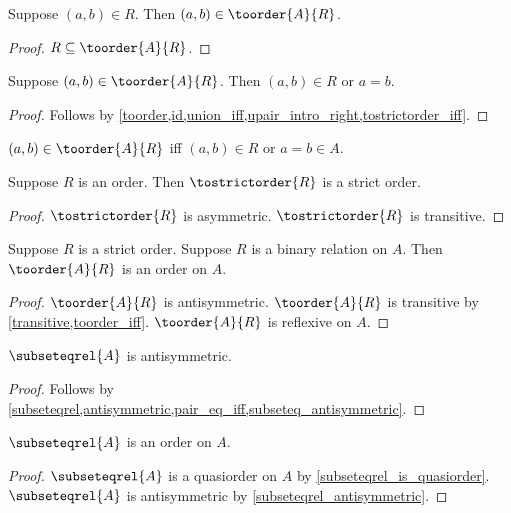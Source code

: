 \begin{proposition}\label{toorder_intro}
    Suppose $(a,b)\in R$.
    Then $(a,b)\in\toorder{A}{R}$.
\end{proposition}
\begin{proof}
    $R\subseteq\toorder{A}{R}$.
\end{proof}

\begin{proposition}\label{toorder_elim}
    Suppose $(a,b)\in\toorder{A}{R}$.
    Then $(a,b)\in R$ or $a = b$.
\end{proposition}
\begin{proof}
    Follows by \cref{toorder,id,union_iff,upair_intro_right,tostrictorder_iff}.
\end{proof}

\begin{proposition}\label{toorder_iff}
    $(a,b)\in\toorder{A}{R}$ iff $(a,b)\in R$ or $a = b\in A$.
\end{proposition}

\begin{proposition}\label{strictorder_from_order}
    Suppose $R$ is an order.
    Then $\tostrictorder{R}$ is a strict order.
\end{proposition}
\begin{proof}
    $\tostrictorder{R}$ is asymmetric.
    $\tostrictorder{R}$ is transitive.
\end{proof}

\begin{proposition}\label{order_from_strictorder}
    Suppose $R$ is a strict order.
    Suppose $R$ is a binary relation on $A$.
    Then $\toorder{A}{R}$ is an order on $A$.
\end{proposition}
\begin{proof}
    $\toorder{A}{R}$ is antisymmetric.
    $\toorder{A}{R}$ is transitive by \cref{transitive,toorder_iff}.
    $\toorder{A}{R}$ is reflexive on $A$.
\end{proof}

\begin{proposition}\label{subseteqrel_antisymmetric}
    $\subseteqrel{A}$ is antisymmetric.
\end{proposition}
\begin{proof}
    Follows by \cref{subseteqrel,antisymmetric,pair_eq_iff,subseteq_antisymmetric}.
\end{proof}


\begin{proposition}\label{subseteqrel_is_order}
    $\subseteqrel{A}$ is an order on $A$.
\end{proposition}
\begin{proof}
    $\subseteqrel{A}$ is a quasiorder on $A$ by \cref{subseteqrel_is_quasiorder}.
    $\subseteqrel{A}$ is antisymmetric by \cref{subseteqrel_antisymmetric}.
\end{proof}


